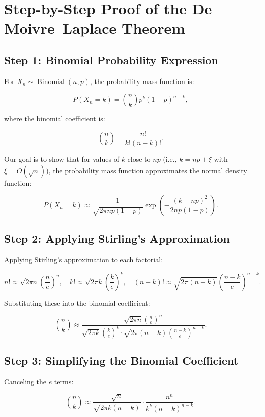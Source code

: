 \documentclass[a4paper,12pt]{article}
\begin{document}
\section{Step-by-Step Proof of the De Moivre–Laplace Theorem}

\subsection{Step 1: Binomial Probability Expression}

For $X_n \sim \operatorname{Binomial}(n, p)$, the probability mass function is:

\[
P(X_n = k) = \binom{n}{k} p^k (1 - p)^{n-k},
\]

where the binomial coefficient is:

\[
\binom{n}{k} = \frac{n!}{k!(n-k)!}.
\]

Our goal is to show that for values of $k$ close to $np$ (i.e., $k = np + \xi$ with $\xi = O(\sqrt{n})$), the probability mass function approximates the normal density function:

\[
P(X_n = k) \approx \frac{1}{\sqrt{2\pi np(1-p)}} \exp\left(-\frac{(k-np)^2}{2np(1-p)}\right).
\]

\subsection{Step 2: Applying Stirling’s Approximation}

Applying Stirling’s approximation to each factorial:

\[
n! \approx \sqrt{2\pi n} \left(\frac{n}{e}\right)^n, \quad
k! \approx \sqrt{2\pi k} \left(\frac{k}{e}\right)^k, \quad
(n-k)! \approx \sqrt{2\pi (n-k)} \left(\frac{n-k}{e}\right)^{n-k}.
\]

Substituting these into the binomial coefficient:

\[
\binom{n}{k} \approx \frac{\sqrt{2\pi n} \left(\frac{n}{e}\right)^n}
{\sqrt{2\pi k} \left(\frac{k}{e}\right)^k \cdot \sqrt{2\pi (n-k)} \left(\frac{n-k}{e}\right)^{n-k}}.
\]

\subsection{Step 3: Simplifying the Binomial Coefficient}

Canceling the $e$ terms:

\[
\binom{n}{k} \approx \frac{\sqrt{n}}{\sqrt{2\pi k(n-k)}}
\cdot \frac{n^n}{k^k (n-k)^{n-k}}.
\]
\end{document}
